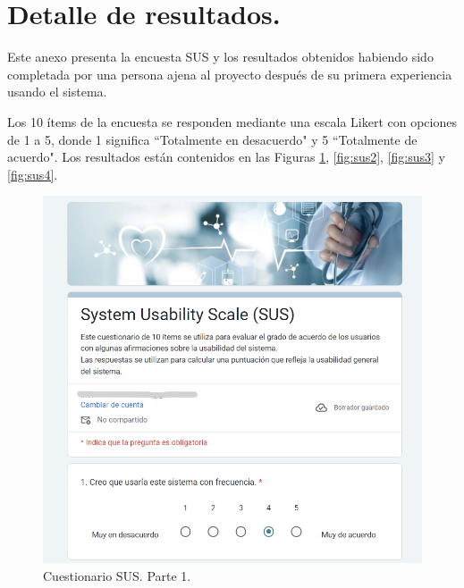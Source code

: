 
\section{Detalle de resultados.}

Este anexo presenta la encuesta SUS y los resultados obtenidos habiendo sido completada por una persona ajena al proyecto después de su primera experiencia usando el sistema.

Los 10 ítems de la encuesta se responden mediante una escala Likert con opciones de 1 a 5, donde 1 significa ``Totalmente en desacuerdo" y 5 ``Totalmente de acuerdo". Los resultados están contenidos en las Figuras \ref{fig:sus1}, \ref{fig:sus2}, \ref{fig:sus3} y \ref{fig:sus4}.

\begin{figure}[h]
    \centering
    \includegraphics[width=1\textwidth]{img/G1_Resultados/sus1.png}
    \caption{Cuestionario SUS. Parte 1.}
    \label{fig:sus1}
\end{figure}

